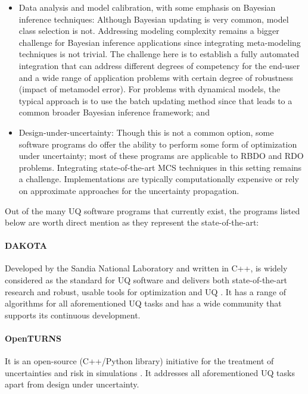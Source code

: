 \begin{itemize}
    \vspace{2mm}    
    \item{Data analysis and model calibration, with some emphasis on Bayesian inference techniques:} Although Bayesian updating is very common, model class selection is not. Addressing modeling complexity remains a bigger challenge for Bayesian inference applications since integrating meta-modeling techniques is not trivial. The challenge here is to establish a fully automated integration that can address different degrees of competency for the end-user and a wide range of application problems with certain degree of robustness (impact of metamodel error). For problems with dynamical models, the typical approach is to use the batch updating method since that leads to a common broader Bayesian inference framework; and
    \vspace{2mm}    
    \item {Design-under-uncertainty:} Though this is not a common option, some software programs do offer the ability to perform some form of optimization under uncertainty; most of these programs are applicable to RBDO and RDO problems. Integrating state-of-the-art MCS techniques in this setting remains a challenge. Implementations are typically computationally expensive or rely on approximate approaches for the uncertainty propagation.
\end{itemize}

\noindent Out of the many UQ software programs that currently exist, the programs listed below are worth direct mention as they represent the state-of-the-art: 

\paragraph{DAKOTA} Developed by the Sandia National Laboratory and written in C++,  is widely considered as the standard for UQ software and delivers both state-of-the-art research and robust, usable tools for optimization and UQ \citep{adams2009dakota}. It has a range of algorithms for all aforementioned UQ tasks and has a wide community that supports its continuous development. 

\paragraph{OpenTURNS} It is an open-source (C++/Python library) initiative for the treatment of uncertainties and risk in simulations \citep{andrianov2007open}. It addresses all aforementioned UQ tasks apart from design under uncertainty. 

